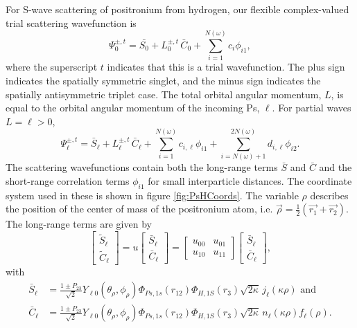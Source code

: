\documentclass[preprint,showpacs,preprintnumbers,amsmath,amssymb]{revtex4}
\begin{document}
For S-wave scattering of positronium from hydrogen, our flexible complex-valued trial scattering wavefunction is
\begin{equation}
\Psi_0^{\pm,t} = \bar{S_0} + L_0^{\pm,t} \, \bar{C}_0 + \sum_{i=1}^{N(\omega)} c_i \phi_{i1},
\label{eq:TrialWave}
\end{equation}
where the superscript $t$ indicates that this is a trial wavefunction. The plus sign indicates the spatially symmetric singlet, and the minus sign indicates the spatially antisymmetric triplet case. The total orbital angular momentum, $L$, is equal to the orbital angular momentum of the incoming Ps, $\ell$. For partial waves $L = \ell > 0$,
\begin{equation}
\Psi_\ell^{\pm,t} = \bar{S}_\ell + L^{\pm,t}_\ell \, \bar{C}_\ell + \sum_{i=1}^{N(\omega)} c_{i,\ell} \phi_{i1} + \!\!\!\sum_{i=N(\omega)+1}^{2N(\omega)} \!\! d_{i,\ell} \phi_{i2}.
\label{eq:TrialWaveHigher}
\end{equation}
The scattering wavefunctions contain both the long-range terms $\bar{S}$ and $\bar{C}$ and the short-range correlation terms $\phi_{i1}$ for small interparticle distances. The coordinate system used in these is shown in figure \ref{fig:PsHCoords}. The variable $\rho$ describes the position of the center of mass of the positronium atom, i.e. $\vec{\rho} = \frac{1}{2}\left(\vec{r_1} + \vec{r_2}\right)$. The long-range terms are given by
\begin{equation}
\label{eq:SCPhiDef}
\begin{bmatrix}
\widetilde{S}_\ell \\ \widetilde{C}_\ell
\end{bmatrix} = u  \begin{bmatrix}
\bar{S}_\ell \\ \bar{C}_\ell
\end{bmatrix} = \begin{bmatrix}
u_{00} & u_{01} \\  u_{10} & u_{11}
\end{bmatrix}
\begin{bmatrix}
\bar{S}_\ell \\ \bar{C}_\ell
\end{bmatrix}, 
\end{equation}
with
\begin{subequations}
\label{eq:SCBarPhiDef}
\begin{align}
\bar{S}_\ell &= \frac{1\pm P_{23}}{\sqrt{2}}Y_{\ell 0}(\theta_\rho,\phi_\rho)\Phi_{Ps,1s}\left(r_{12}\right) \Phi_{H,1S}\left(r_3\right) \sqrt{2\kappa} \,j_\ell\left(\kappa\rho\right) \text{ and} \label{eq:SBar} \\
\bar{C}_\ell &= \frac{1\pm P_{23}}{\sqrt{2}}Y_{\ell 0}(\theta_\rho,\phi_\rho)\Phi_{Ps,1s}\left(r_{12}\right) \Phi_{H,1S}\left(r_3\right) \sqrt{2\kappa} \,n_\ell\left(\kappa\rho\right) f_\ell(\rho). \label{eq:CBar}
\end{align}
\end{subequations}
\end{document}
